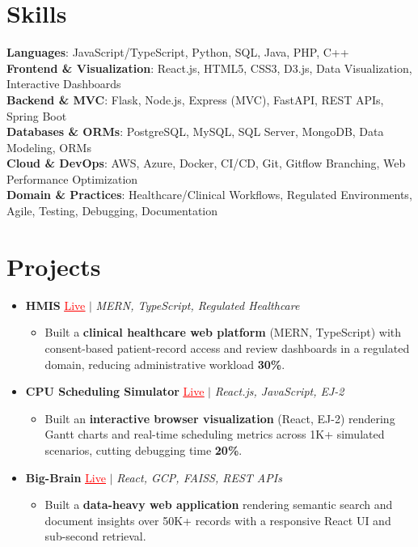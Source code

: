 \documentclass[letterpaper,10pt]{article}
\newcommand{\resumeItem}[1]{\item\small{{#1 \vspace{-2pt}}}}
\newcommand{\resumeProjectHeading}[1]{\item \small #1 \vspace{-2pt}}
\newcommand{\resumeSubHeadingListStart}{\begin{itemize}[leftmargin=0.0in, label={}]}
\newcommand{\resumeSubHeadingListEnd}{\end{itemize}}
\newcommand{\resumeProjItemListStart}{\begin{itemize}[leftmargin=0.15in,label=\textbullet,itemsep=0pt,topsep=0pt,parsep=0pt,partopsep=0pt]}
\newcommand{\resumeProjItemListEnd}{\end{itemize}\vspace{-4pt}}
\begin{document}
\section{Skills}
\begin{itemize}[leftmargin=0.15in, label={}]
\small{\item{
\textbf{Languages}: JavaScript/TypeScript, Python, SQL, Java, PHP, C++ \\
\textbf{Frontend \& Visualization}: React.js, HTML5, CSS3, D3.js, Data Visualization, Interactive Dashboards \\
\textbf{Backend \& MVC}: Flask, Node.js, Express (MVC), FastAPI, REST APIs, Spring Boot \\
\textbf{Databases \& ORMs}: PostgreSQL, MySQL, SQL Server, MongoDB, Data Modeling, ORMs \\
\textbf{Cloud \& DevOps}: AWS, Azure, Docker, CI/CD, Git, Gitflow Branching, Web Performance Optimization \\
\textbf{Domain \& Practices}: Healthcare/Clinical Workflows, Regulated Environments, Agile, Testing, Debugging, Documentation
}}
\end{itemize}
\vspace{-6pt}
\section{Projects}
\resumeSubHeadingListStart
\vspace{-2pt}
\resumeProjectHeading{\textbf{HMIS} {\href{https://hims-rouge.vercel.app/}{\textcolor{red}{\underline{Live}}}} $|$ \emph{MERN, TypeScript, Regulated Healthcare}}
\resumeProjItemListStart
\resumeItem{Built a \textbf{clinical healthcare web platform} (MERN, TypeScript) with consent-based patient-record access and review dashboards in a regulated domain, reducing administrative workload \textbf{30\%}.}
\resumeProjItemListEnd
\vspace{3pt}
\resumeProjectHeading{\textbf{CPU Scheduling Simulator} {\href{https://cpu-scheduler-amber.vercel.app/}{\textcolor{red}{\underline{Live}}}} $|$ \emph{React.js, JavaScript, EJ-2}}
\resumeProjItemListStart
\resumeItem{Built an \textbf{interactive browser visualization} (React, EJ-2) rendering Gantt charts and real-time scheduling metrics across 1K+ simulated scenarios, cutting debugging time \textbf{20\%}.}
\resumeProjItemListEnd
\vspace{3pt}
\resumeProjectHeading{\textbf{Big-Brain} {\href{https://big-brain-pied.vercel.app/}{\textcolor{red}{\underline{Live}}}} $|$ \emph{React, GCP, FAISS, REST APIs}}
\resumeProjItemListStart
\resumeItem{Built a \textbf{data-heavy web application} rendering semantic search and document insights over 50K+ records with a responsive React UI and sub-second retrieval.}
\resumeProjItemListEnd
\resumeSubHeadingListEnd
\end{document}
